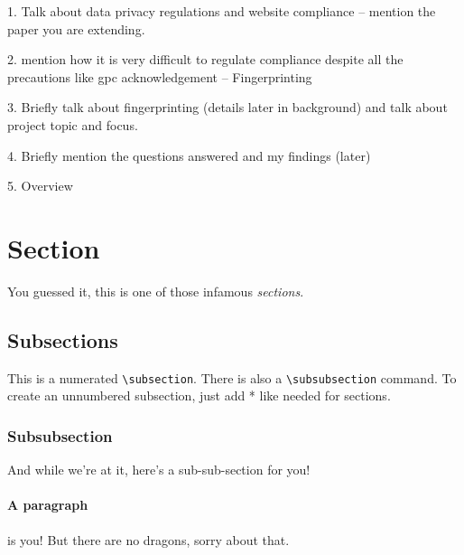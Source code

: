 1. Talk about data privacy regulations and website compliance -- mention the paper you are extending.

2. mention how it is very difficult to regulate compliance despite all the precautions like gpc acknowledgement -- Fingerprinting

3. Briefly talk about fingerprinting (details later in background) and talk about project topic and focus.

4. Briefly mention the questions answered and my findings (later)

5. Overview



\section{Section}

You guessed it, this is one of those infamous \emph{sections}.

\subsection{Subsections}

This is a numerated \texttt{\textbackslash{}subsection}. There is also a \texttt{\textbackslash{}subsubsection} command. To create an unnumbered subsection, just add * like needed for sections.

\subsubsection{Subsubsection}

And while we're at it, here's a sub-sub-section for you!

\paragraph{A paragraph} is you! But there are no dragons, sorry about that.

